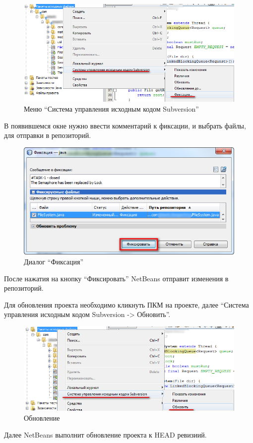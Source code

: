\documentclass[a4paper,12pt]{article}
\begin{document}
\begin{figure}[h!]
	\centering
	\includegraphics[scale=0.70]{netbeans-commit-1.png}
	\caption{Меню ``Система управления исходным кодом Subversion''}
\end{figure}

В появившемся окне нужно ввести комментарий к фиксации, и выбрать файлы,
для отправки в репозиторий.

\begin{figure}[h!]
	\centering
	\includegraphics[scale=0.70]{netbeans-commit-2.png}
	\caption{Диалог ``Фиксация''}
\end{figure}

После нажатия на кнопку ``Фиксировать'' NetBeans отправит изменения в
репозиторий.

Для обновления проекта необходимо кликнуть ПКМ на проекте, далее
``Система управления исходным кодом Subversion -\textgreater{}
Обновить''.

\begin{figure}[h!]
\centering
\includegraphics[scale=0.60]{netbeans-update-1.png}
\caption{Обновление}
\end{figure}

Далее NetBeans выполнит обновление проекта к HEAD ревизиий.
\end{document}
